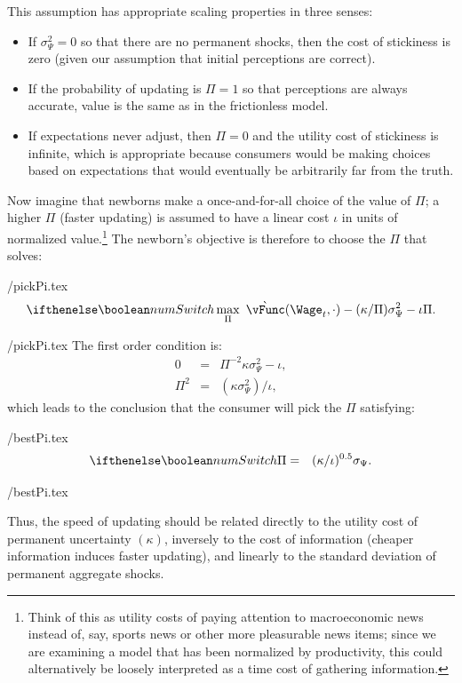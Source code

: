 \documentclass[titlepage]{\econtex}\newcommand{\texname}{cAndCwithStickyE}
\begin{document}
This assumption has appropriate scaling properties in three senses:
\begin{itemize}
\item If $\sigma^{2}_{\Psi}=0$ so that there are no permanent shocks, then
the cost of stickiness is zero (given our assumption that initial perceptions are correct).
\item If the probability of updating is $\Pi=1$ so that perceptions
are always accurate, value is the same as in the frictionless model.
\item If expectations never adjust, then $\Pi=0$ and the utility cost of stickiness is infinite,
which is appropriate because consumers would be making choices based on
expectations that would eventually be arbitrarily far from the truth.
\end{itemize}

Now imagine that newborns make a once-and-for-all choice of the value of $\Pi$; a higher $\Pi$ (faster updating) is assumed to have a linear cost $\iota$ in units of normalized value.\footnote{Think of this as utility costs of paying attention to macroeconomic news instead of, say, sports news or other more pleasurable news items; since we are examining a model that has been normalized by productivity, this could alternatively be loosely interpreted as a time cost of gathering information.}  The newborn's objective is therefore to choose the $\Pi$ that solves:
\begin{verbatimwrite}{\eq/pickPi.tex}
\begin{eqnarray}
\ifnumSw  \max_{\Pi} ~ \grave{\vFunc}(\Wage_t,\cdot)-(\kappa/\Pi)\sigma^{2}_{\Psi}-\iota\Pi. \label{eq:pickPi}
\end{eqnarray}
\end{verbatimwrite}
 \eq/pickPi.tex
The first order condition is:
\begin{eqnarray*}
     0 & = & \Pi^{-2}\kappa\sigma^{2}_{\Psi}-\iota,
\\  \Pi^{2} & = & (\kappa \sigma^{2}_{\Psi})/\iota,
\end{eqnarray*}
which leads to the conclusion that the consumer will
pick the $\Pi$ satisfying:
\begin{verbatimwrite}{\eq/bestPi.tex}
\begin{eqnarray}
\ifnumSw \Pi & = &  (\kappa/\iota)^{0.5} \sigma_{\Psi}. \label{eq:bestPi}
\end{eqnarray}
\end{verbatimwrite}
 \eq/bestPi.tex

Thus, the speed of updating should be related directly to the utility cost of permanent uncertainty $(\kappa)$, inversely to the cost of information (cheaper information induces faster updating), and linearly to the standard deviation of permanent aggregate shocks.
\end{document}
